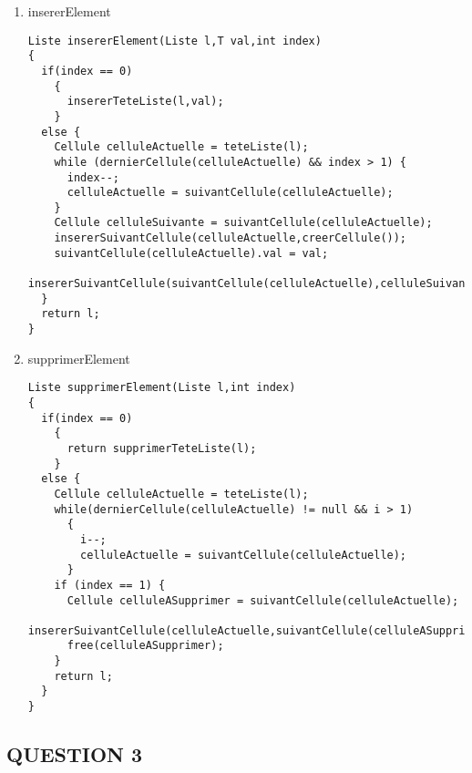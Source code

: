 \documentclass[11pt]{article}
\begin{document}
\begin{enumerate}
\begin{lstlisting}
}
\end{lstlisting}
\item insererElement
\label{sec:org8d6b7ad}

\begin{lstlisting}
Liste insererElement(Liste l,T val,int index)
{
  if(index == 0)
    {
      insererTeteListe(l,val);
    }
  else {
    Cellule celluleActuelle = teteListe(l);
    while (dernierCellule(celluleActuelle) && index > 1) {
      index--;
      celluleActuelle = suivantCellule(celluleActuelle);
    }
    Cellule celluleSuivante = suivantCellule(celluleActuelle);
    insererSuivantCellule(celluleActuelle,creerCellule());
    suivantCellule(celluleActuelle).val = val;
    insererSuivantCellule(suivantCellule(celluleActuelle),celluleSuivante)
  }
  return l;
}
\end{lstlisting}
\item supprimerElement
\label{sec:org3f913d2}

\begin{lstlisting}
Liste supprimerElement(Liste l,int index)
{
  if(index == 0)
    {
      return supprimerTeteListe(l);
    }
  else {
    Cellule celluleActuelle = teteListe(l);
    while(dernierCellule(celluleActuelle) != null && i > 1)
      {
        i--;
        celluleActuelle = suivantCellule(celluleActuelle);
      }
    if (index == 1) {
      Cellule celluleASupprimer = suivantCellule(celluleActuelle);
      insererSuivantCellule(celluleActuelle,suivantCellule(celluleASupprimer));
      free(celluleASupprimer);
    }
    return l;
  }
}
\end{lstlisting}
\end{enumerate}



\subsection{QUESTION 3}
\label{sec:org6959c9b}
\end{document}
